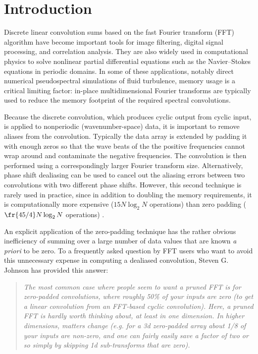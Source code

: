 \documentclass[final]{siamltex}
\begin{document}

\section{Introduction}
Discrete linear convolution sums based on the fast Fourier transform (FFT)
algorithm have become important tools for image filtering, digital signal
processing, and correlation analysis. They are also widely used in
computational physics to solve nonlinear partial differential equations
such as the Navier--Stokes equations in periodic domains. In some of these
applications, notably direct numerical pseudospectral simulations of fluid
turbulence, memory usage is a critical limiting factor: in-place
multidimensional Fourier transforms are typically used to reduce the memory
footprint of the required spectral convolutions.

Because the discrete convolution, which produces cyclic output from cyclic
input, is applied to nonperiodic (wavenumber-space) data, it is important
to remove aliases from the convolution. Typically the data array is
extended by padding it with enough zeros so that the wave beats of the
the positive frequencies cannot wrap around and contaminate
the negative frequencies. The convolution is then performed using a
correspondingly larger Fourier transform size. Alternatively, phase
shift dealiasing \cite{Patterson71,Canuto} can be used to cancel out the
aliasing errors between two convolutions with two different phase
shifts. However, this second technique is rarely used in practice, since in
addition to doubling the memory requirements, it is computationally more
expensive ($15N\log_2 N$ operations) than zero padding
($\fr{45/4}N\log_2 N$ operations) \cite[p.~136]{Canuto}. 

An explicit application of the zero-padding technique has the rather
obvious inefficiency of summing over a large number of data values that
are known {\it a priori\/} to be zero.
To a frequently asked question by FFT users who want to avoid this
unnecessary expense in computing a dealiased convolution,
Steven G. Johnson has provided this
answer\cite{http://www.fftw.org/pruned.html}:
\begin{quotation}
{\it
The most common case where people seem to want a pruned FFT is for
zero-padded convolutions, where roughly 50\% of your inputs are zero (to
get a linear convolution from an FFT-based cyclic convolution). Here, a
pruned FFT is hardly worth thinking about, at least in one dimension. In
higher dimensions, matters change (e.g. for a 3d zero-padded array about
1/8 of your inputs are non-zero, and one can fairly easily save a factor of
two or so simply by skipping 1d sub-transforms that are zero).
}
\end{quotation}
\end{document}
